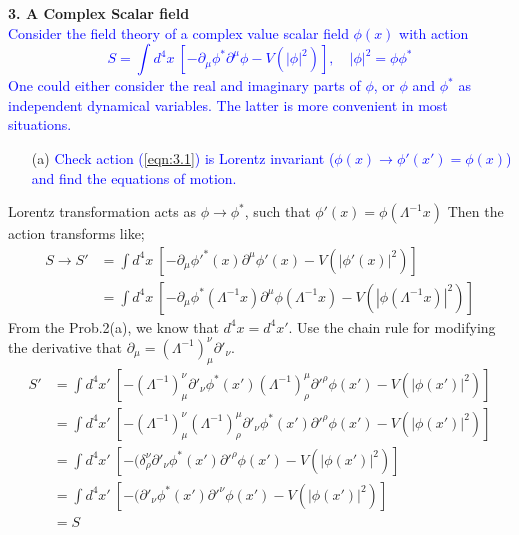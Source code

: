 \documentclass[11pt, a4paper]{article}
\begin{document}
\newpage

\textbf{3. A Complex Scalar field}\\
\textcolor{blue}{
Consider the field theory of a complex value scalar field $\phi(x)$ with action
\begin{equation}\label{eqn:3.1}
    S = \int d^4 x \ \left[ -\partial_\mu \phi^* \partial^\mu \phi - V(|\phi|^2) \right], \quad |\phi|^2 = \phi \phi^*
\end{equation}
One could either consider the real and imaginary parts of $\phi$, or $\phi$ and $\phi^*$ as independent dynamical variables. The latter is more convenient in most situations.
}
\begin{enumerate}
    \item [(a)] \textcolor{blue}{
    Check action (\ref{eqn:3.1}) is Lorentz invariant ($\phi(x) \to \phi'(x') = \phi(x)$) and find the equations of motion.
    }
\end{enumerate}
Lorentz transformation acts as $\phi \to \phi^*$, such that $\phi'(x) = \phi(\Lambda^{-1} x)$
Then the action transforms like;
\begin{align}
    S  \to S' & = \int d^4 x \ \left[ -\partial_\mu \phi'^*(x) \partial^\mu \phi'(x) - V(|\phi'(x)|^2) \right] \\
    & = \int d^4 x \ \left[ -\partial_\mu \phi^*(\Lambda^{-1}x) \partial^\mu \phi(\Lambda^{-1}x) - V(|\phi(\Lambda^{-1}x)|^2) \right]
\end{align}
From the Prob.2(a), we know that $d^4x = d^4x'$.
Use the chain rule for modifying the derivative that $\partial_\mu = (\Lambda^{-1})^\nu_\mu\partial'_\nu$.
\begin{align}
    S' & = \int d^4 x' \ \left[-(\Lambda^{-1})^\nu_\mu\partial'_\nu \phi^*(x') (\Lambda^{-1})^\mu_\rho\partial'^\rho \phi(x') - V(|\phi(x')|^2) \right] \\
    & = \int d^4 x' \ \left[-( \Lambda^{-1})^\nu_\mu(\Lambda^{-1})^\mu_\rho \partial'_\nu \phi^*(x') \partial'^\rho \phi(x') - V(|\phi(x')|^2) \right] \\
    & = \int d^4 x' \ \left[-( \delta^\nu_\rho \partial'_\nu \phi^*(x') \partial'^\rho \phi(x') - V(|\phi(x')|^2) \right] \\
    & = \int d^4 x' \ \left[-( \partial'_\nu \phi^*(x') \partial'^\nu \phi(x') - V(|\phi(x')|^2) \right] \\
    & = S
\end{align}
\end{document}
